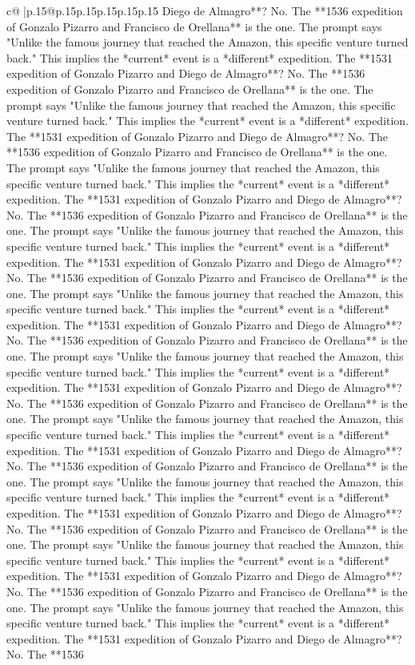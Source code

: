 \documentclass{article}
\begin{document}
{\begin{supertabular}{c@{$\;$}|p{.15\linewidth}@{}p{.15\linewidth}p{.15\linewidth}p{.15\linewidth}p{.15\linewidth}p{.15\linewidth}}
{{{Diego de Almagro**? No. The **1536 expedition of Gonzalo Pizarro and Francisco de Orellana** is the one. The prompt says "Unlike the famous journey that reached the Amazon, this specific venture turned back." This implies the *current* event is a *different* expedition. The **1531 expedition of Gonzalo Pizarro and Diego de Almagro**? No. The **1536 expedition of Gonzalo Pizarro and Francisco de Orellana** is the one. The prompt says "Unlike the famous journey that reached the Amazon, this specific venture turned back." This implies the *current* event is a *different* expedition. The **1531 expedition of Gonzalo Pizarro and Diego de Almagro**? No. The **1536 expedition of Gonzalo Pizarro and Francisco de Orellana** is the one. The prompt says "Unlike the famous journey that reached the Amazon, this specific venture turned back." This implies the *current* event is a *different* expedition. The **1531 expedition of Gonzalo Pizarro and Diego de Almagro**? No. The **1536 expedition of Gonzalo Pizarro and Francisco de Orellana** is the one. The prompt says "Unlike the famous journey that reached the Amazon, this specific venture turned back." This implies the *current* event is a *different* expedition. The **1531 expedition of Gonzalo Pizarro and Diego de Almagro**? No. The **1536 expedition of Gonzalo Pizarro and Francisco de Orellana** is the one. The prompt says "Unlike the famous journey that reached the Amazon, this specific venture turned back." This implies the *current* event is a *different* expedition. The **1531 expedition of Gonzalo Pizarro and Diego de Almagro**? No. The **1536 expedition of Gonzalo Pizarro and Francisco de Orellana** is the one. The prompt says "Unlike the famous journey that reached the Amazon, this specific venture turned back." This implies the *current* event is a *different* expedition. The **1531 expedition of Gonzalo Pizarro and Diego de Almagro**? No. The **1536 expedition of Gonzalo Pizarro and Francisco de Orellana** is the one. The prompt says "Unlike the famous journey that reached the Amazon, this specific venture turned back." This implies the *current* event is a *different* expedition. The **1531 expedition of Gonzalo Pizarro and Diego de Almagro**? No. The **1536 expedition of Gonzalo Pizarro and Francisco de Orellana** is the one. The prompt says "Unlike the famous journey that reached the Amazon, this specific venture turned back." This implies the *current* event is a *different* expedition. The **1531 expedition of Gonzalo Pizarro and Diego de Almagro**? No. The **1536 expedition of Gonzalo Pizarro and Francisco de Orellana** is the one. The prompt says "Unlike the famous journey that reached the Amazon, this specific venture turned back." This implies the *current* event is a *different* expedition. The **1531 expedition of Gonzalo Pizarro and Diego de Almagro**? No. The **1536 expedition of Gonzalo Pizarro and Francisco de Orellana** is the one. The prompt says "Unlike the famous journey that reached the Amazon, this specific venture turned back." This implies the *current* event is a *different* expedition. The **1531 expedition of Gonzalo Pizarro and Diego de Almagro**? No. The **1536 }}}
\end{supertabular}}
\end{document}
